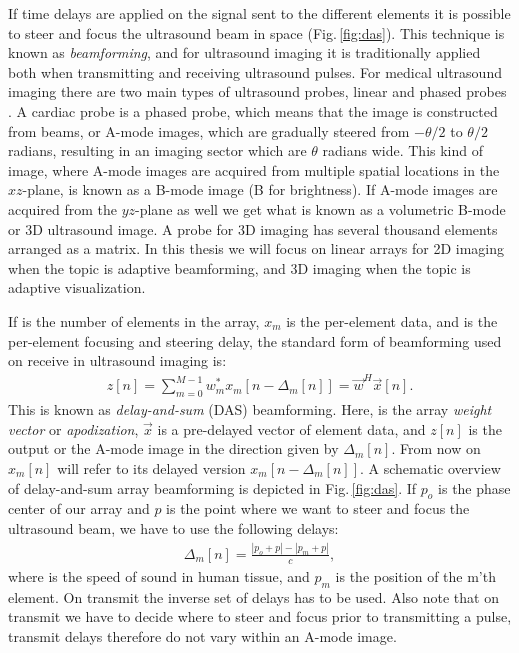 If time delays are applied on the signal sent to the different elements it is possible to steer and focus the ultrasound beam in space (Fig.\,\ref{fig:das}). This technique is known as \textit{beamforming}, and for ultrasound imaging it is traditionally applied both when transmitting and receiving ultrasound pulses. For medical ultrasound imaging there are two main types of ultrasound probes, linear and phased probes \cite{AngelUltrasound}. A cardiac probe is a phased probe, which means that the image is constructed from beams, or A-mode images, which are gradually steered from $-\theta/2$ to $\theta/2$ radians, resulting in an imaging sector which are $\theta$ radians wide. This kind of image, where A-mode images are acquired from multiple spatial locations in the $xz$-plane, is known as a B-mode image (B for brightness). If A-mode images are acquired from the $yz$-plane as well we get what is known as a volumetric B-mode or 3D ultrasound image. A probe for 3D imaging has several thousand elements arranged as a matrix. In this thesis we will focus on linear arrays for 2D imaging when the topic is adaptive beamforming, and 3D imaging when the topic is adaptive visualization.

If  is the number of elements in the array, $x_m$ is the per-element data, and  is the per-element focusing and steering delay, the standard form of beamforming used on receive in ultrasound imaging is:
\begin{align}\label{eq:das}
z[n] = \sum_{m = 0}^{M-1}w_m^*x_m[n - \Delta_m[n]] = \vec{w}^H\vec{x}[n].
\end{align}
This is known as \textit{delay-and-sum} (DAS) beamforming. Here,  is the array \textit{weight vector} or \textit{apodization}, $\vec{x}$ is a pre-delayed vector of element data, and $z[n]$ is the output or the A-mode image in the direction given by $\Delta_m[n]$.  From now on $x_m[n]$ will refer to its delayed version $x_m[n-\Delta_m[n]]$. A schematic overview of delay-and-sum array beamforming is depicted in Fig.\,\ref{fig:das}. If $p_o$ is the phase center of our array and $p$ is the point where we want to steer and focus the ultrasound beam, we have to use the following delays:
\begin{align}
\Delta_m[n] =\frac{|p_o+p| - |p_m+p|}{c},
\end{align}
where  is the speed of sound in human tissue, and $p_m$ is the position of the m'th element. On transmit the inverse set of delays has to be used. Also note that on transmit we have to decide where to steer and focus prior to transmitting a pulse, transmit delays therefore do not vary within an A-mode image.

